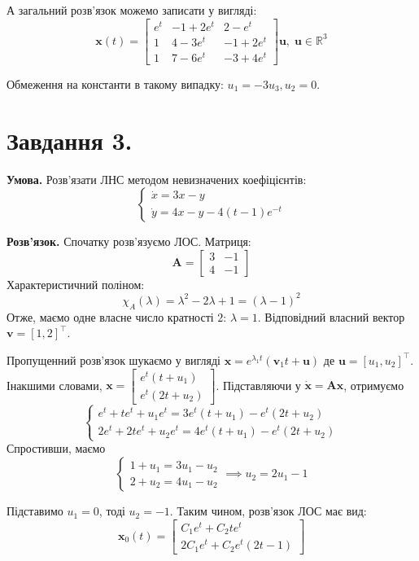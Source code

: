 \documentclass[14pt]{extarticle}
\begin{document}
А загальний розв'язок можемо записати у вигляді:
\[
\textbf{x}(t) = \begin{bmatrix}
    e^t & -1+2e^t & 2-e^t \\ 1 & 4 - 3e^t & -1+2e^t \\ 1 & 7-6e^t & -3+4e^t
\end{bmatrix}\mathbf{u}, \; \mathbf{u} \in \mathbb{R}^3
\]

Обмеження на константи в такому випадку: $u_1=-3u_3,u_2=0$.

\section*{Завдання 3.} 

\textbf{Умова.} Розв’язати ЛНС методом невизначених коефіцієнтів:
\[
\begin{cases}
    \dot{x} = 3x - y \\
    \dot{y} = 4x - y - 4(t-1)e^{-t}
\end{cases}
\]

\textbf{Розв'язок.} Спочатку розв'язуємо ЛОС. Матриця:
\[
\boldsymbol{A} = \begin{bmatrix}
    3 & -1 \\ 4 & -1
\end{bmatrix}
\]
Характеристичний поліном:
\[
\chi_A(\lambda) = \lambda^2 - 2\lambda + 1 = (\lambda-1)^2
\]
Отже, маємо одне власне число кратності $2$: $\lambda=1$. Відповідний власний вектор $\mathbf{v}=[1,2]^{\top}$. 

Пропущенний розв'язок шукаємо у вигляді $\textbf{x}=e^{\lambda_1t}(\textbf{v}_1t + \textbf{u})$ де $\textbf{u}=[u_1,u_2]^{\top}$. Інакшими словами, $\textbf{x} = \begin{bmatrix}
    e^t(t+u_1) \\ e^t(2t+u_2)
\end{bmatrix}$. Підставляючи у $\dot{\textbf{x}}=\boldsymbol{A}\textbf{x}$, отримуємо
\[
\begin{cases}
e^t + te^t + u_1e^t = 3e^t(t+u_1) - e^t(2t+u_2) \\
2e^t+2te^t+u_2e^t = 4e^t(t+u_1)-e^t(2t+u_2)
\end{cases}
\]
Спростивши, маємо
\[
\begin{cases}
    1+u_1 = 3u_1 - u_2 \\ 
    2+u_2 = 4u_1-u_2
\end{cases} \implies u_2 = 2u_1-1
\]

Підставимо $u_1=0$, тоді $u_2=-1$. Таким чином, розв'язок ЛОС має вид:
\[
\textbf{x}_{0}(t) = \begin{bmatrix}
    C_1e^t + C_2te^t \\ 2C_1e^t + C_2e^t(2t-1)
\end{bmatrix}
\]
\end{document}
